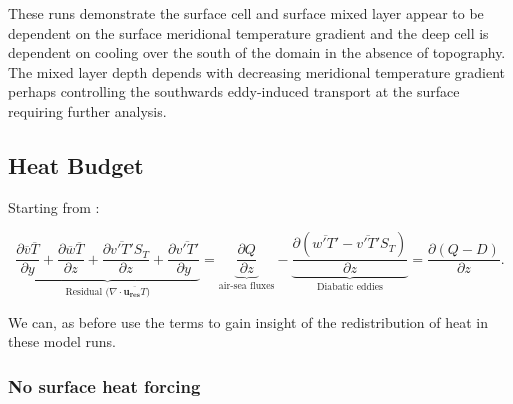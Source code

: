 These runs demonstrate the surface cell and surface mixed layer appear to be dependent on the surface meridional temperature gradient and the deep cell is dependent on cooling over the south of the domain in the absence of topography. The mixed layer depth depends with decreasing meridional temperature gradient perhaps controlling the southwards eddy-induced transport at the surface requiring further analysis.


\subsection*{Heat Budget}

Starting from :

\begin{equation*}
\underbrace{\frac{\partial \overline{v}\overline{T}}{\partial y } + \frac{\partial\overline{w} \overline{T}}{\partial z } + \frac{\partial \overline{v'T'}S_T}{\partial z } + \frac{\partial \overline{v'T'}}{\partial y }}_\text{Residual ($\nabla \cdot \overline{\textbf{u$_{\textbf{res}}$}T}$)} = \underbrace{\frac{\partial Q}{\partial z}}_\text{air-sea fluxes} - \underbrace{\frac{\partial \left( \overline{w'T'}-\overline{v'T'}S_T \right)}{\partial z }}_\text{Diabatic eddies} = \frac{\partial (Q - D)}{\partial z}.
\end{equation*}

We can, as before use the terms to gain insight of the redistribution of heat in these model runs. 

\subsubsection*{No surface heat forcing}


